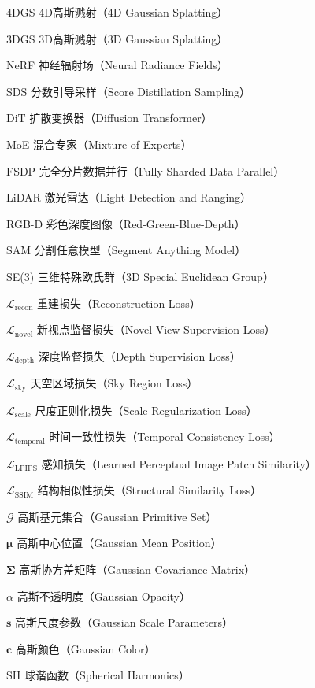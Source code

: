 
\begin{denotation}[4cm]
  \item[4DGS] 4D高斯溅射（4D Gaussian Splatting）
  \item[3DGS] 3D高斯溅射（3D Gaussian Splatting）
  \item[NeRF] 神经辐射场（Neural Radiance Fields）
  \item[SDS] 分数引导采样（Score Distillation Sampling）
  \item[DiT] 扩散变换器（Diffusion Transformer）
  \item[MoE] 混合专家（Mixture of Experts）
  \item[FSDP] 完全分片数据并行（Fully Sharded Data Parallel）
  \item[LiDAR] 激光雷达（Light Detection and Ranging）
  \item[RGB-D] 彩色深度图像（Red-Green-Blue-Depth）
  \item[SAM] 分割任意模型（Segment Anything Model）
  \item[SE(3)] 三维特殊欧氏群（3D Special Euclidean Group）
  
  \item[$\mathcal{L}_{\text{recon}}$] 重建损失（Reconstruction Loss）
  \item[$\mathcal{L}_{\text{novel}}$] 新视点监督损失（Novel View Supervision Loss）
  \item[$\mathcal{L}_{\text{depth}}$] 深度监督损失（Depth Supervision Loss）
  \item[$\mathcal{L}_{\text{sky}}$] 天空区域损失（Sky Region Loss）
  \item[$\mathcal{L}_{\text{scale}}$] 尺度正则化损失（Scale Regularization Loss）
  \item[$\mathcal{L}_{\text{temporal}}$] 时间一致性损失（Temporal Consistency Loss）
  \item[$\mathcal{L}_{\text{LPIPS}}$] 感知损失（Learned Perceptual Image Patch Similarity）
  \item[$\mathcal{L}_{\text{SSIM}}$] 结构相似性损失（Structural Similarity Loss）
  
  \item[$\mathcal{G}$] 高斯基元集合（Gaussian Primitive Set）
  \item[$\boldsymbol{\mu}$] 高斯中心位置（Gaussian Mean Position）
  \item[$\boldsymbol{\Sigma}$] 高斯协方差矩阵（Gaussian Covariance Matrix）
  \item[$\alpha$] 高斯不透明度（Gaussian Opacity）
  \item[$\mathbf{s}$] 高斯尺度参数（Gaussian Scale Parameters）
  \item[$\mathbf{c}$] 高斯颜色（Gaussian Color）
  \item[SH] 球谐函数（Spherical Harmonics）
  

\end{denotation}
